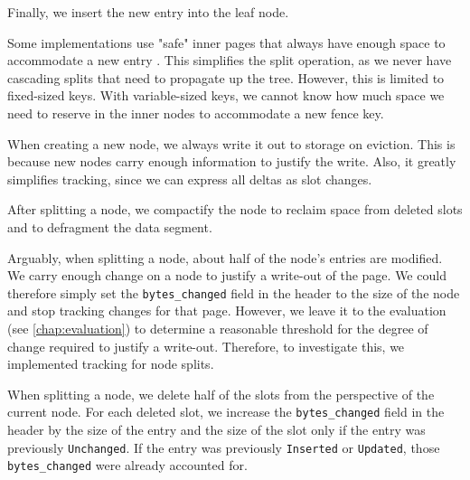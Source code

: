 Finally, we insert the new entry into the leaf node.

Some implementations use "safe" inner pages that always have enough space to accommodate a new entry \cite{mdbs2024slides}.
This simplifies the split operation, as we never have cascading splits that need to propagate up the tree.
However, this is limited to fixed-sized keys.
With variable-sized keys, we cannot know how much space we need to reserve in the inner nodes to accommodate a new fence key.

When creating a new node, we always write it out to storage on eviction.
This is because new nodes carry enough information to justify the write.
Also, it greatly simplifies tracking, since we can express all deltas as slot changes.

After splitting a node, we compactify the node to reclaim space from deleted slots and to defragment the data segment.

Arguably, when splitting a node, about half of the node's entries are modified.
We carry enough change on a node to justify a write-out of the page.
We could therefore simply set the \texttt{bytes\_changed} field in the header to the size of the node and stop tracking changes for that page.
However, we leave it to the evaluation (see \autoref{chap:evaluation}) to determine a reasonable threshold for the degree of change required to justify a write-out.
Therefore, to investigate this, we implemented tracking for node splits.

When splitting a node, we delete half of the slots from the perspective of the current node.
For each deleted slot, we increase the \texttt{bytes\_changed} field in the header by the size of the entry and the size of the slot only if the entry was previously \texttt{Unchanged}.
If the entry was previously \texttt{Inserted} or \texttt{Updated}, those \texttt{bytes\_changed} were already accounted for.

